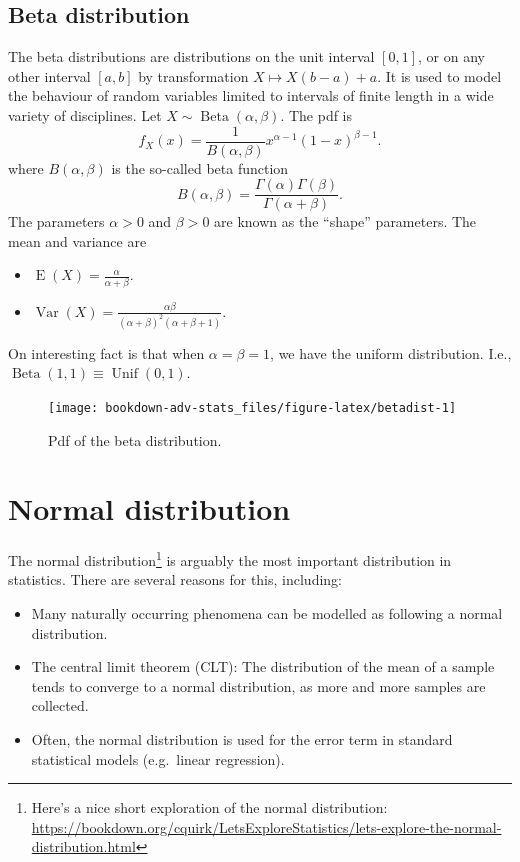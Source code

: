 \documentclass[
]{book}
\providecommand{\tightlist}{%
  \setlength{\itemsep}{0pt}\setlength{\parskip}{0pt}}
\DeclareMathOperator{\E}{E}
\DeclareMathOperator{\Var}{Var}
\DeclareMathOperator{\Betadist}{Beta}
\DeclareMathOperator{\Unif}{Unif}
\theoremstyle{definition}
\theoremstyle{definition}
\theoremstyle{definition}
\theoremstyle{definition}
\theoremstyle{remark}
\begin{document}
\hypertarget{beta-distribution}{%
\subsection{Beta distribution}\label{beta-distribution}}

The beta distributions are distributions on the unit interval \([0,1]\), or on any other interval \([a,b]\) by transformation \(X \mapsto X(b-a) + a\).
It is used to model the behaviour of random variables limited to intervals of finite length in a wide variety of disciplines.
Let \(X\sim \Betadist(\alpha,\beta)\).
The pdf is
\[
  f_X(x) = \frac{1}{B(\alpha,\beta)} x^{\alpha-1} (1-x)^{\beta-1}.
\]
where \(B(\alpha,\beta)\) is the so-called beta function
\[B(\alpha,\beta) = \frac{\Gamma(\alpha)\Gamma(\beta)}{\Gamma(\alpha+\beta)}.\]
The parameters \(\alpha>0\) and \(\beta>0\) are known as the ``shape'' parameters.
The mean and variance are

\begin{itemize}
\tightlist
\item
  \(\E(X)=\frac{\alpha}{\alpha+\beta}\).
\item
  \(\Var(X)=\frac{\alpha\beta}{(\alpha+\beta)^2(\alpha+\beta+1)}\).
\end{itemize}

On interesting fact is that when \(\alpha=\beta=1\), we have the uniform distribution.
I.e., \(\Betadist(1,1)\equiv \Unif(0,1)\).

\begin{figure}

{\centering \texttt{[image: bookdown-adv-stats\_files/figure-latex/betadist-1]} 

}

\caption{Pdf of the beta distribution.}\label{fig:betadist}
\end{figure}

\hypertarget{normal-distribution}{%
\section{Normal distribution}\label{normal-distribution}}

The normal distribution\footnote{Here's a nice short exploration of the normal distribution: \url{https://bookdown.org/cquirk/LetsExploreStatistics/lets-explore-the-normal-distribution.html}} is arguably the most important distribution in statistics.
There are several reasons for this, including:

\begin{itemize}
\tightlist
\item
  Many naturally occurring phenomena can be modelled as following a normal distribution.
\item
  The central limit theorem (CLT): The distribution of the mean of a sample tends to converge to a normal distribution, as more and more samples are collected.
\item
  Often, the normal distribution is used for the error term in standard statistical models (e.g.~linear regression).
\end{itemize}
\end{document}
